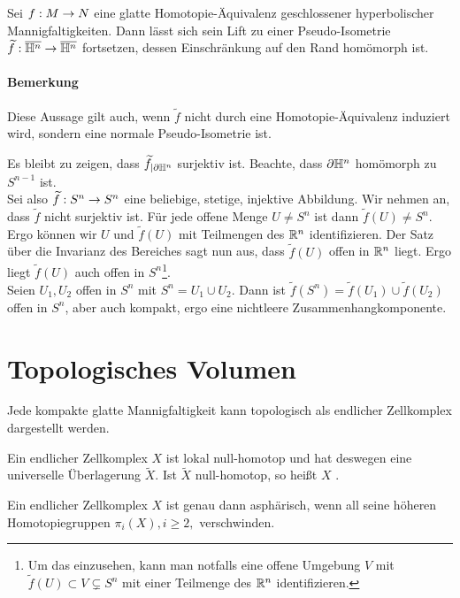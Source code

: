 \documentclass{book}
\begin{document}
\Satz{}
Sei $f : M \overset{}{\rightarrow} N$ eine glatte Homotopie-Äquivalenz geschlossener hyperbolischer Mannigfaltigkeiten. Dann lässt sich sein Lift zu einer Pseudo-Isometrie $\widetilde{f} : \overline{\mathbb{H}^n} \overset{}{\rightarrow}\overline{\mathbb{H}^n}$ fortsetzen, dessen Einschränkung auf den Rand homömorph ist.
\paragraph{Bemerkung}
Diese Aussage gilt auch, wenn $\widetilde{f}$ nicht durch eine Homotopie-Äquivalenz induziert wird, sondern eine normale Pseudo-Isometrie ist.
\begin{Beweis}{} %
	Es bleibt zu zeigen, dass $\widetilde{f}_{|\partial \mathbb{H}^n}$ surjektiv ist. Beachte, dass $\partial \mathbb{H}^n$ homömorph zu $S^{n-1}$ ist.\\
	Sei also $\widetilde{f} : S^n \overset{}{\rightarrow} S^n$ eine beliebige, stetige, injektive Abbildung. Wir nehmen an, dass $\widetilde{f}$ nicht surjektiv ist. Für jede offene Menge $U \neq S^n$ ist dann $\widetilde{f}(U) \neq S^n$. Ergo können wir $U$ und $\widetilde{f}(U)$ mit Teilmengen des $\mathbb{R}^n$ identifizieren. Der Satz über die Invarianz des Bereiches sagt nun aus, dass $\widetilde{f}(U)$ offen in $\mathbb{R}^n$ liegt. Ergo liegt $\widetilde{f}(U)$ auch offen in $S^n$\footnote{Um das einzusehen, kann man notfalls eine offene Umgebung $V$ mit $\widetilde{f}(U) \subset V \subsetneq S^n$ mit einer Teilmenge des $\mathbb{R}^n$ identifizieren.}.\\
	Seien $U_1,U_2$ offen in $S^n$ mit $S^n = U_1 \cup U_2$. Dann ist $\widetilde{f}(S^n) = \widetilde{f}(U_1) \cup \widetilde{f}(U_2)$ offen in $S^n$, aber auch kompakt, ergo eine nichtleere Zusammenhangkomponente.
\end{Beweis}

\section{Topologisches Volumen}
\Satz{}
Jede kompakte glatte Mannigfaltigkeit kann topologisch als endlicher Zellkomplex dargestellt werden.

\Def{}
Ein endlicher Zellkomplex $X$ ist lokal null-homotop und hat deswegen eine universelle Überlagerung $\widetilde{X}$. Ist $\widetilde{X}$ null-homotop, so heißt $X$ .

Ein endlicher Zellkomplex $X$ ist genau dann asphärisch, wenn all seine höheren Homotopiegruppen $\pi_i(X), i\geq 2,$ verschwinden.
\end{document}
